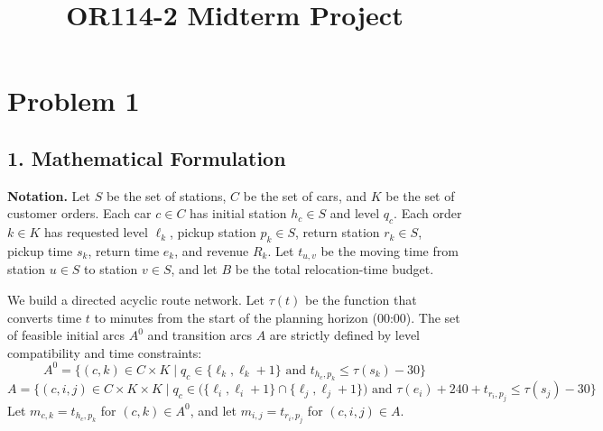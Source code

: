 \documentclass[10pt,a4paper]{article}
\title{OR114-2 Midterm Project}
\author{}
\date{}
\begin{document}
\maketitle

\section*{Problem 1}
\subsection*{1. Mathematical Formulation}

\textbf{Notation.}
Let $S$ be the set of stations, $C$ be the set of cars, and $K$ be the set of
customer orders.  Each car $c\in C$ has initial station $h_c\in S$ and level
$q_c$.  Each order $k\in K$ has requested level $\ell_k$, pickup station
$p_k\in S$, return station $r_k\in S$, pickup time $s_k$, return time $e_k$,
and revenue $R_k$.  Let $t_{u,v}$ be the moving time from station $u\in S$ to
station $v\in S$, and let $B$ be the total relocation-time budget.

We build a directed acyclic route network. Let $\tau(t)$ be the function that converts time $t$ to minutes from the start of the planning horizon (00:00). The set of feasible initial arcs $A^0$ and transition arcs $A$ are strictly defined by level compatibility and time constraints:
\[
A^0 = \{(c,k)\in C\times K \mid q_c\in\{\ell_k,\ell_k+1\} \text{ and } t_{h_c, p_k}\le \tau(s_k)-30\}
\]
\[
A = \Big\{ (c, i, j) \in C \times K \times K \;\Big|\; q_c \in \big(\{\ell_i, \ell_i+1\} \cap \{\ell_j, \ell_j+1\}\big) \text{ and } \tau(e_i) + 240 + t_{r_i, p_j} \le \tau(s_j) - 30 \Big\}
\]
Let $m_{c,k}=t_{h_c, p_k}$ for $(c,k)\in A^0$, and let
$m_{i,j}=t_{r_i, p_j}$ for $(c,i,j)\in A$.
\end{document}
